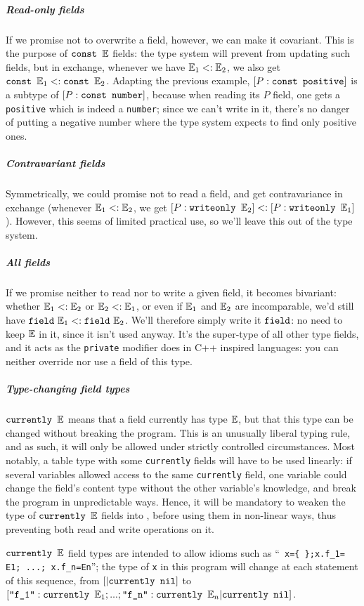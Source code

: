 \subparagraph{Read-only fields}
If we promise not to overwrite a field, however, we can make it
covariant. This is the purpose of $\texttt{const }\mathbb{E}$ fields: the type system
will prevent from updating such fields, but in exchange, whenever we
have $\mathbb{E}_1<:\mathbb{E}_2$, we also get $\texttt{const }\mathbb{E}_1<: \texttt{const }\mathbb{E}_2$. Adapting the
previous example, $[P: \texttt{const }\texttt {positive}]$ is a subtype of $[P:
  \texttt{const }\texttt {number}]$, because when reading its $P$ field, one
gets a {\tt positive} which is indeed a {\tt number}; since we can't
write in it, there's no danger of putting a negative number where the
type system expects to find only positive ones.

\subparagraph{Contravariant fields}
Symmetrically, we could promise not to read a field, and get
contravariance in exchange (whenever $\mathbb{E}_1<:\mathbb{E}_2$, we get
$[P:\texttt{writeonly }\mathbb{E}_2]<:[P:\texttt{writeonly }\mathbb{E}_1]$). However,
this seems of limited practical use, so we'll leave this out of the
type system.

\subparagraph{All fields} If we promise neither to read nor
to write a given field, it becomes bivariant: whether $\mathbb{E}_1<:\mathbb{E}_2$
or $\mathbb{E}_2<:\mathbb{E}_1$, or even if $\mathbb{E}_1$ and $\mathbb{E}_2$ are
incomparable, we'd still have $\texttt{field}\ \mathbb{E}_1 <: \texttt{field}\ \mathbb{E}_2$. We'll therefore simply write it $\texttt{field}$: no need to keep $\mathbb{E}$ in it, since it isn't used anyway. It's the super-type of all other
type fields, and it acts as the {\tt private} modifier does in C++
inspired languages: you can neither override nor use a field of this
type.

\subparagraph{Type-changing field types}

$\texttt{currently }\mathbb{E}$ means that a field currently has type $\mathbb{E}$, but that this
type can be changed without breaking the program. This is an
unusually liberal typing rule, and as such, it will only be allowed
under strictly controlled circumstances. Most notably, a table type
with some \verb+currently+ fields will have to be used linearly: if
several variables allowed access to the same \verb+currently+ field, one
variable could change the field's content type without the other
variable's knowledge, and break the program in unpredictable
ways. Hence, it will be mandatory to weaken the type of $\texttt{currently }\mathbb{E}$ fields into \F, before using them in non-linear ways, thus
preventing both read and write operations on it.

$\texttt{currently }\mathbb{E}$ field types are intended to allow idioms such as ``{\tt
  x=\verb+{ }+;x.f\_1= E1; ...; x.f\_n=En}''; the type of \verb+x+ in
this program will change at each statement of this sequence, from
$[|\texttt{currently }\texttt{nil}]$ to $[\texttt{"f\_1"}:\texttt{currently }\mathbb{E}_1; ...; \allowbreak
  \texttt{"f\_n"}:\texttt{currently }\mathbb{E}_n|\texttt{currently }\texttt{nil}]$.


